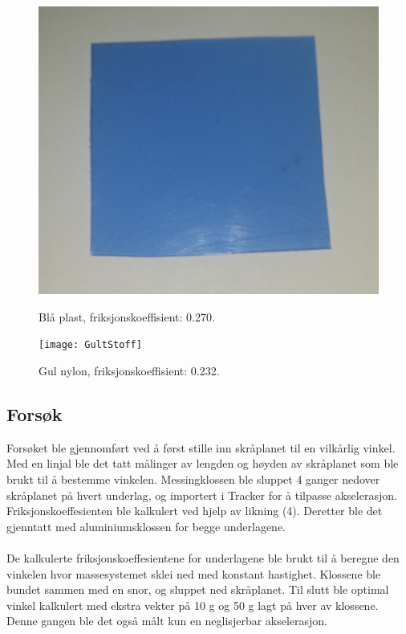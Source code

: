 \documentclass[10pt,a4paper]{report}
\begin{document}
\begin{figure}[h]
\begin{minipage}{.5\textwidth}
\centerline{\includegraphics[scale=0.05]{BlaaPlast}}
    \caption{Blå plast, friksjonskoeffisient: 0.270.}
    \label{fig:1}
\end{minipage}
\begin{minipage}{.5\textwidth}
    \centerline{\texttt{[image: GultStoff]}}
    \caption{Gul nylon, friksjonskoeffisient: 0.232.}
    \label{fig:2}

\end{minipage}
\end{figure}

\subsection*{Forsøk}
Forsøket ble gjennomført ved å først stille inn skråplanet til en vilkårlig vinkel. Med en linjal ble det tatt målinger av lengden og høyden av skråplanet som ble brukt til å bestemme vinkelen. Messingklossen ble sluppet 4 ganger nedover skråplanet på hvert underlag, og importert i Tracker for å tilpasse akselerasjon. Friksjonskoeffesienten ble kalkulert ved hjelp av likning (4). Deretter ble det gjenntatt med aluminiumsklossen for begge underlagene. \\
\\De kalkulerte friksjonskoeffesientene for underlagene ble brukt til å beregne den vinkelen hvor massesystemet sklei ned med konstant hastighet. Klossene ble bundet sammen med en snor, og sluppet ned skråplanet. Til slutt ble optimal vinkel kalkulert med ekstra vekter på 10 g og 50 g lagt på hver av klossene. Denne gangen ble det også målt kun en neglisjerbar akselerasjon.
\end{document}
